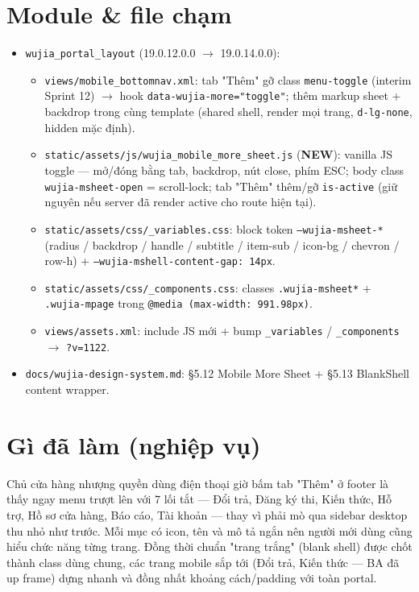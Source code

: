 \section{Module \& file chạm}

\begin{itemize}
  \item \texttt{wujia\_portal\_layout} (19.0.12.0.0 \(\rightarrow\) 19.0.14.0.0):
    \begin{itemize}
      \item \texttt{views/mobile\_bottomnav.xml}: tab "Thêm" gỡ class
            \texttt{menu-toggle} (interim Sprint 12) \(\rightarrow\) hook
            \texttt{data-wujia-more="toggle"}; thêm markup sheet + backdrop trong
            cùng template (shared shell, render mọi trang, \texttt{d-lg-none},
            hidden mặc định).
      \item \texttt{static/assets/js/wujia\_mobile\_more\_sheet.js} (\textbf{NEW}):
            vanilla JS toggle --- mở/đóng bằng tab, backdrop, nút close, phím ESC;
            body class \texttt{wujia-msheet-open} = scroll-lock; tab "Thêm" thêm/gỡ
            \texttt{is-active} (giữ nguyên nếu server đã render active cho route
            hiện tại).
      \item \texttt{static/assets/css/\_variables.css}: block token
            \texttt{--wujia-msheet-*} (radius / backdrop / handle / subtitle /
            item-sub / icon-bg / chevron / row-h) +
            \texttt{--wujia-mshell-content-gap: 14px}.
      \item \texttt{static/assets/css/\_components.css}: classes
            \texttt{.wujia-msheet*} + \texttt{.wujia-mpage} trong
            \texttt{@media (max-width: 991.98px)}.
      \item \texttt{views/assets.xml}: include JS mới + bump \texttt{\_variables} /
            \texttt{\_components} \(\rightarrow\) \texttt{?v=1122}.
    \end{itemize}
  \item \texttt{docs/wujia-design-system.md}: \S5.12 Mobile More Sheet + \S5.13
        BlankShell content wrapper.
\end{itemize}

\section{Gì đã làm (nghiệp vụ)}

Chủ cửa hàng nhượng quyền dùng điện thoại giờ bấm tab "Thêm" ở footer là thấy ngay
menu trượt lên với 7 lối tắt --- Đổi trả, Đăng ký thi, Kiến thức, Hỗ trợ, Hồ sơ cửa
hàng, Báo cáo, Tài khoản --- thay vì phải mò qua sidebar desktop thu nhỏ như trước.
Mỗi mục có icon, tên và mô tả ngắn nên người mới dùng cũng hiểu chức năng từng trang.
Đồng thời chuẩn "trang trắng" (blank shell) được chốt thành class dùng chung, các
trang mobile sắp tới (Đổi trả, Kiến thức --- BA đã up frame) dựng nhanh và đồng nhất
khoảng cách/padding với toàn portal.


